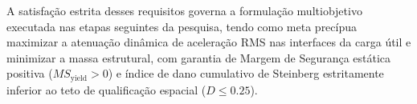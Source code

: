 A satisfação estrita desses requisitos governa a formulação multiobjetivo executada nas etapas seguintes da pesquisa, tendo como meta precípua maximizar a atenuação dinâmica de aceleração RMS nas interfaces da carga útil e minimizar a massa estrutural, com garantia de Margem de Segurança estática positiva ($MS_{\text{yield}} > 0$) e índice de dano cumulativo de Steinberg estritamente inferior ao teto de qualificação espacial ($D \le \num{0.25}$).

